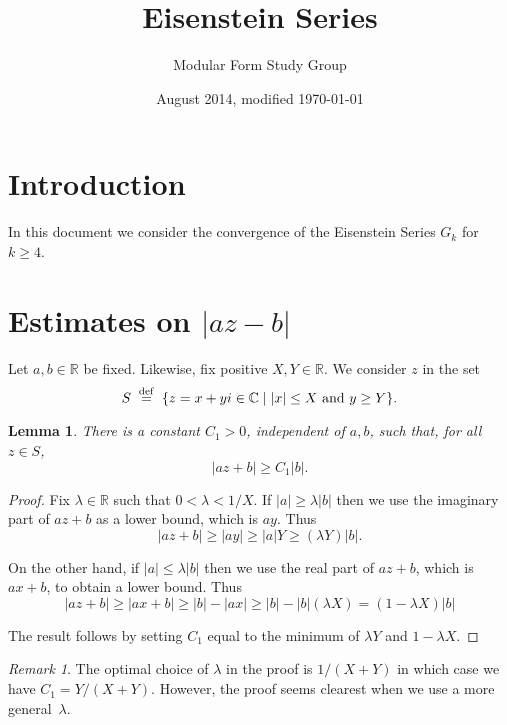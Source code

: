 \documentclass {amsart}
\theoremstyle{plain}
\newtheorem{lemma}[proposition]{Lemma}
\theoremstyle{definition}
\theoremstyle{remark}
\newtheorem*{remark}{Remark}
\newcommand{\defeq}{\stackrel{\mathrm{def}}{\, = \,}}
\newcommand{\bR}{{\mathbb{R}}}
\newcommand{\bC}{{\mathbb{C}}}
\begin{document}
 

\title{Eisenstein Series}

\author{Modular Form Study Group}

\date{August 2014, modified \today}

\maketitle


\section {Introduction}

In this document we consider the convergence of
the Eisenstein Series $G_k$ for $k \ge 4$.


\section {Estimates on $|a z - b|$}

Let $a, b \in \bR$ be fixed. 
Likewise, fix positive $X, Y \in \bR$.
We consider $z$ in the set 
$$S \; \defeq \; \{ z = x + y i \in \bC \mid \hbox{$|x| \le X$  and $y \ge Y$} \}.$$

\begin{lemma}
There is a constant $C_1 > 0$, independent of $a, b$, such that, for all $z\in S$,
$$
|a z + b| \ge C_1 |b|.
$$
\end{lemma}

\begin{proof}
Fix $\lambda \in \bR$ such that $0 < \lambda < 1/X$.
If $|a| \ge \lambda |b|$ then we use the imaginary part of $a z + b$ as a lower bound, which
is $a y$. Thus
$$
|a z + b| \ge |a y|  \ge |a| Y \ge (\lambda Y) |b|.
$$

On the other hand, if $|a| \le \lambda |b|$ then we use the real part of $a z + b$,
which is $a x + b$, to obtain a lower bound. Thus
$$
|a z + b| \ge |a x + b|  \ge |b| - |ax| \ge |b| - |b| (\lambda X) = (1 - \lambda X) |b| 
$$

The result follows by setting $C_1$ equal to the minimum of $\lambda Y$ and $1 - \lambda X$.
\end{proof}

\begin{remark}
 The optimal choice of $\lambda$ in the proof is $1/(X + Y)$ in which case we have $C_1 = Y/(X+Y)$. However, the proof seems clearest when we use a more  general~$\lambda$.
\end{remark}
\end{document}
